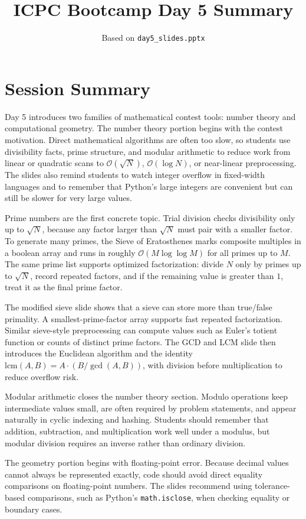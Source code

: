 \documentclass[11pt]{article}
\title{ICPC Bootcamp Day 5 Summary}
\author{Based on \texttt{day5\_slides.pptx}}
\date{}
\begin{document}
\maketitle

\section*{Session Summary}
Day 5 introduces two families of mathematical contest tools: number theory and computational geometry. The number theory portion begins with the contest motivation. Direct mathematical algorithms are often too slow, so students use divisibility facts, prime structure, and modular arithmetic to reduce work from linear or quadratic scans to \(\mathcal{O}(\sqrt{N})\), \(\mathcal{O}(\log N)\), or near-linear preprocessing. The slides also remind students to watch integer overflow in fixed-width languages and to remember that Python's large integers are convenient but can still be slower for very large values.

Prime numbers are the first concrete topic. Trial division checks divisibility only up to \(\sqrt{N}\), because any factor larger than \(\sqrt{N}\) must pair with a smaller factor. To generate many primes, the Sieve of Eratosthenes marks composite multiples in a boolean array and runs in roughly \(\mathcal{O}(M \log \log M)\) for all primes up to \(M\). The same prime list supports optimized factorization: divide \(N\) only by primes up to \(\sqrt{N}\), record repeated factors, and if the remaining value is greater than \(1\), treat it as the final prime factor.

The modified sieve slide shows that a sieve can store more than true/false primality. A smallest-prime-factor array supports fast repeated factorization. Similar sieve-style preprocessing can compute values such as Euler's totient function or counts of distinct prime factors. The GCD and LCM slide then introduces the Euclidean algorithm and the identity \(\text{lcm}(A,B)=A \cdot (B/\gcd(A,B))\), with division before multiplication to reduce overflow risk.

Modular arithmetic closes the number theory section. Modulo operations keep intermediate values small, are often required by problem statements, and appear naturally in cyclic indexing and hashing. Students should remember that addition, subtraction, and multiplication work well under a modulus, but modular division requires an inverse rather than ordinary division.

The geometry portion begins with floating-point error. Because decimal values cannot always be represented exactly, code should avoid direct equality comparisons on floating-point numbers. The slides recommend using tolerance-based comparisons, such as Python's \texttt{math.isclose}, when checking equality or boundary cases.
\end{document}
